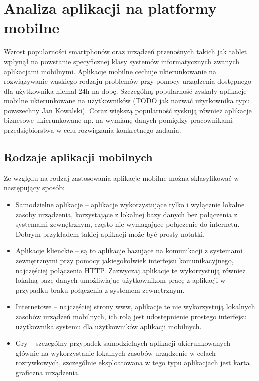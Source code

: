\chapter{Analiza aplikacji na platformy mobilne}
\label{cha:analizaAplikacjiMobilnych}

Wzrost popularności smartphonów oraz urządzeń przenośnych takich jak tablet wpłynął na powstanie specyficznej klasy systemów informatycznych zwanych aplikacjami mobilnymi. Aplikacje mobilne cechuje ukierunkowanie na rozwiązywanie wąskiego rodzaju problemów przy pomocy urządzenia dostępnego dla użytkownika niemal 24h na dobę. Szczególną popularność zyskały aplikacje mobilne ukierunkowane na użytkowników (TODO jak nazwać użytkownika typu powszechny Jan Kowalski). Coraz większą popularność zyskują również aplikacje biznesowe ukierunkowane np. na wymianę danych pomiędzy pracownikami przedsiębiorstwa w celu rozwiązania konkretnego zadania. 

\section{Rodzaje aplikacji mobilnych}
\label{sec:rodzajeAplikacjiMobilnych}

Ze względu na rodzaj zastosowania aplikacje mobilne można sklasyfikować w następujący sposób:

\begin{itemize}
\item Samodzielne aplikacje -- aplikacje wykorzystujące tylko i wyłącznie lokalne zasoby urządzenia, korzystające z lokalnej bazy danych bez połączenia z systemami zewnętrznym, często nie wymagające połączenie do internetu. Dobrym przykładem takiej aplikacji może być prosty notatki.  
\item Aplikacje klienckie -- są to aplikacje bazujące na komunikacji z systemami zewnętrznymi przy pomocy jakiegokolwiek interfejsu komunikacyjnego,  najczęściej połączenia HTTP. Zazwyczaj aplikacje te wykorzystują również lokalną bazę danych umożliwiając użytkownikom pracę z aplikacji w przypadku braku połączenia z systemem zewnętrznym.
\item Internetowe -- najczęściej strony www, aplikacje  te nie wykorzystują lokalnych zasobów urządzeń mobilnych, ich rolą jest udostępnienie prostego interfejsu użytkownika systemu dla użytkowników aplikacji mobilnych.
\item Gry  -- szczególny przypadek samodzielnych aplikacji ukierunkowanych głównie na wykorzystanie lokalnych zasobów urządzenie w celach rozrywkowych, szczególnie eksploatowana w tego typu aplikacjach jest karta graficzna urządzenia.
\end{itemize}

